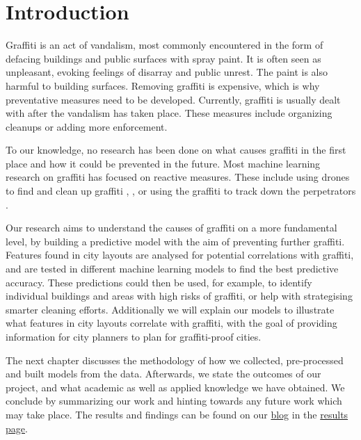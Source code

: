 \chapter{Introduction}


Graffiti is an act of vandalism, most commonly encountered in the form of defacing buildings and public surfaces with spray paint. It is often seen as unpleasant, evoking feelings of disarray and public unrest. The paint is also harmful to building surfaces. Removing graffiti is expensive, which is why preventative measures need to be developed. Currently, graffiti is usually dealt with after the vandalism has taken place. These measures include organizing cleanups or adding more enforcement.

To our knowledge, no research has been done on what causes graffiti in the first place and how it could be prevented in the future. Most machine learning research on graffiti has focused on reactive measures. These include using drones to find and clean up graffiti \cite{uav}, \cite{drone}, or using the graffiti to track down the perpetrators \cite{gang}.

Our research aims to understand the causes of graffiti on a more fundamental level, by building a predictive model with the aim of preventing further graffiti. Features found in city layouts are analysed for potential correlations with graffiti, and are tested in different machine learning models to find the best predictive accuracy. These predictions could then be used, for example, to identify individual buildings and areas with high risks of graffiti, or help with strategising smarter cleaning efforts. Additionally we will explain our models to illustrate what features in city layouts correlate with graffiti, with the goal of providing information for city planners to plan for graffiti-proof cities.

The next chapter discusses the methodology of how we collected, pre-processed and built models from the data. Afterwards, we state the outcomes of our project, and what academic as well as applied knowledge we have obtained. We conclude by summarizing our work and hinting towards any future work which may take place. The results and findings can be found on our \href{https://cowkeyman.github.io/PredictingGraffitiUsingCityLayouts/}{blog} in the \href{https://cowkeyman.github.io/PredictingGraffitiUsingCityLayouts/results.html}{results page}.
